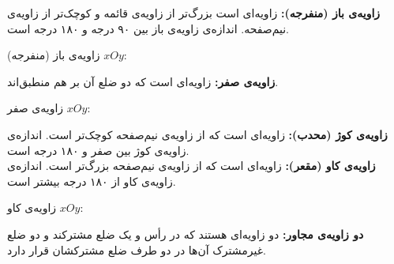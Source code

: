 \smallskip
\textbf{زاویه‌ی باز (منفرجه):}
زاویه‌ای است بزرگ‌تر از زاویه‌ی قائمه و کوچک‌تر از زاویه‌ی نیم‌صفحه. اندازه‌ی زاویه‌ی باز بین ۹۰ درجه و ۱۸۰ درجه است.
\begin{example}
	زاویه‌ی باز (منفرجه) $xOy$:
	\begin{center}
	\end{center}
\end{example}
\smallskip
\textbf{زاویه‌ی صفر:}
زاویه‌ای است که دو ضلع آن بر هم منطبق‌اند.
\begin{example}
	زاویه‌ی صفر $xOy$:
	\begin{center}
	\end{center}
\end{example}
\smallskip
\textbf{زاویه‌ی کوژ (محدب):}
زاویه‌ای است که از زاویه‌ی نیم‌صفحه کوچک‌تر است. اندازه‌ی زاویه‌ی کوژ بین صفر و ۱۸۰ درجه است.
\\
\textbf{زاویه‌ی کاو (مقعر):}
زاویه‌ای است که از زاویه‌ی نیم‌صفحه بزرگ‌تر است. اندازه‌ی زاویه‌ی کاو از ۱۸۰ درجه بیشتر است.
\begin{example}
	زاویه‌ی کاو $xOy$:
	\begin{center}
	\end{center}
\end{example}
\smallskip
\textbf{دو زاویه‌ی مجاور:}
دو زاویه‌ای هستند که در رأس و یک ضلع مشترکند و دو ضلع غیرمشترک آن‌ها در دو طرف ضلع مشترکشان قرار دارد.
